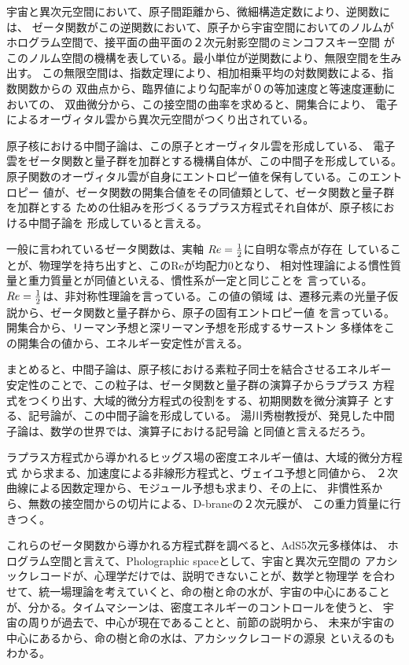 \documentclass{jsarticle}
\begin{document}
\title{}
\author{}
\date{}
\maketitle

宇宙と異次元空間において、原子間距離から、微細構造定数により、逆関数には、
ゼータ関数がこの逆関数において、原子から宇宙空間においてのノルムが
ホログラム空間で、接平面の曲平面の２次元射影空間のミンコフスキー空間
がこのノルム空間の機構を表している。最小単位が逆関数により、無限空間を生み出す。
この無限空間は、指数定理により、相加相乗平均の対数関数による、指数関数からの
双曲点から、臨界値により勾配率が０の等加速度と等速度運動においての、
双曲微分から、この接空間の曲率を求めると、開集合により、
電子によるオーヴィタル雲から異次元空間がつくり出されている。
 
  原子核における中間子論は、この原子とオーヴィタル雲を形成している、
電子雲をゼータ関数と量子群を加群とする機構自体が、この中間子を形成している。
原子関数のオーヴィタル雲が自身にエントロピー値を保有している。このエントロピー
値が、ゼータ関数の開集合値をその同値類として、ゼータ関数と量子群を加群とする
ための仕組みを形づくるラプラス方程式それ自体が、原子核における中間子論を
形成していると言える。

 一般に言われているゼータ関数は、実軸 $Re={1 \over 2} $に自明な零点が存在
していることが、物理学を持ち出すと、このReが均配力0となり、
相対性理論による慣性質量と重力質量とが同値といえる、慣性系が一定と同じことを
言っている。$Re = {1 \over 2} $は、非対称性理論を言っている。この値の領域
は、遷移元素の光量子仮説から、ゼータ関数と量子群から、原子の固有エントロピー値
を言っている。開集合から、リーマン予想と深リーマン予想を形成するサーストン
多様体をこの開集合の値から、エネルギー安定性が言える。
 
 まとめると、中間子論は、原子核における素粒子同士を結合させるエネルギー
安定性のことで、この粒子は、ゼータ関数と量子群の演算子からラプラス
方程式をつくり出す、大域的微分方程式の役割をする、初期関数を微分演算子
とする、記号論が、この中間子論を形成している。
湯川秀樹教授が、発見した中間子論は、数学の世界では、演算子における記号論
と同値と言えるだろう。

 ラプラス方程式から導かれるヒッグス場の密度エネルギー値は、大域的微分方程式
から求まる、加速度による非線形方程式と、ヴェイユ予想と同値から、
２次曲線による因数定理から、モジュール予想も求まり、その上に、
非慣性系から、無数の接空間からの切片による、D-braneの２次元膜が、
この重力質量に行きつく。

 これらのゼータ関数から導かれる方程式群を調べると、AdS5次元多様体は、
ホログラム空間と言えて、Pholographic spaceとして、宇宙と異次元空間の
アカシックレコードが、心理学だけでは、説明できないことが、数学と物理学
を合わせて、統一場理論を考えていくと、命の樹と命の水が、宇宙の中心にあること
が、分かる。タイムマシーンは、密度エネルギーのコントロールを使うと、
宇宙の周りが過去で、中心が現在であることと、前節の説明から、
未来が宇宙の中心にあるから、命の樹と命の水は、アカシックレコードの源泉
といえるのもわかる。
\end{document}
